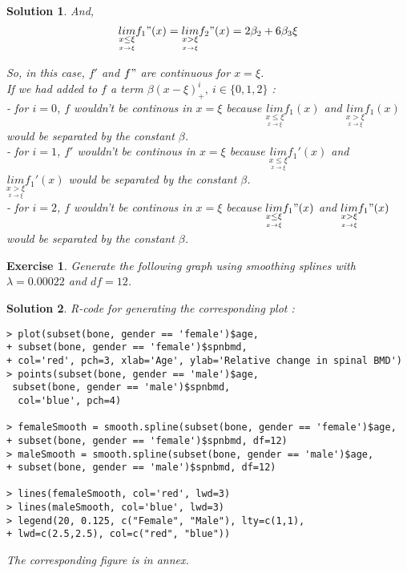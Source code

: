 \documentclass[12pt,a4paper]{article}
\newtheorem{exercise}{Exercise}
\newtheorem{solution}{Solution}
\begin{document}
\begin{solution}
And,$$\underset{\underset{x\rightarrow\xi}{x \leq \xi}}{lim}f_1"(x) = \underset{\underset{x\rightarrow\xi}{x > \xi}}{lim}f_2"(x) = 2\beta_2 + 6 \beta_3\xi$$	

So, in this case, $f'$ and $f"$ are continuous for $x=\xi$.\\

If we had added to $f$ a term $\beta (x - \xi)_+^i,\ i\in\{0,1,2\}$ : \\  
- for $i=0$, $f$ wouldn't be continous in $x = \xi$ because $\underset{\underset{x\rightarrow\xi}{x \leq \xi}}{lim}f_1(x)$ and $\underset{\underset{x\rightarrow\xi}{x > \xi}}{lim}f_1(x)$ would be separated by the constant $\beta$. \\
- for $i=1$, $f'$ wouldn't be continous in $x = \xi$ because $\underset{\underset{x\rightarrow\xi}{x \leq \xi}}{lim}f_1'(x)$ and $\underset{\underset{x\rightarrow\xi}{x > \xi}}{lim}f_1'(x)$ would be separated by the constant $\beta$. \\
- for $i=2$, $f$ wouldn't be continous in $x = \xi$ because $\underset{\underset{x\rightarrow\xi}{x \leq \xi}}{lim}f_1"(x)$ and $\underset{\underset{x\rightarrow\xi}{x > \xi}}{lim}f_1"(x)$ would be separated by the constant $\beta$. \\
\end{solution}

\begin{exercise}
Generate the following graph using smoothing splines with $\lambda = 0.00022$ and $df = 12$.
\end{exercise}
\begin{solution}
R-code for generating the corresponding plot : \\
\begin{verbatim}
> plot(subset(bone, gender == 'female')$age,
+ subset(bone, gender == 'female')$spnbmd, 
+ col='red', pch=3, xlab='Age', ylab='Relative change in spinal BMD')
> points(subset(bone, gender == 'male')$age,
 subset(bone, gender == 'male')$spnbmd,
  col='blue', pch=4)

> femaleSmooth = smooth.spline(subset(bone, gender == 'female')$age, 
+ subset(bone, gender == 'female')$spnbmd, df=12)
> maleSmooth = smooth.spline(subset(bone, gender == 'male')$age, 
+ subset(bone, gender == 'male')$spnbmd, df=12)

> lines(femaleSmooth, col='red', lwd=3)
> lines(maleSmooth, col='blue', lwd=3)
> legend(20, 0.125, c("Female", "Male"), lty=c(1,1),
+ lwd=c(2.5,2.5), col=c("red", "blue"))
\end{verbatim}

The corresponding figure is in annex.\\
\end{solution}
\end{document}
